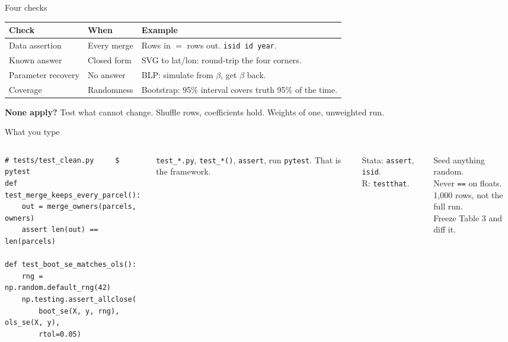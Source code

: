 \documentclass[9pt,aspectratio=169]{beamer}
\begin{document}
\begin{frame}{Four checks}

  \vspace{0.35cm}
  \renewcommand{\arraystretch}{1.7}
  \small
  \begin{tabular}{@{}p{} p{} p{}@{}}
    \toprule
    {\color{bhblue}\bfseries Check} & {\color{bhblue}\bfseries When} & {\color{bhblue}\bfseries Example} \\
    \midrule
    Data assertion     & Every merge  & Rows in $=$ rows out. \texttt{isid id year}. \\
    Known answer       & Closed form  & SVG to lat/lon: round-trip the four corners. \\
    Parameter recovery & No answer    & BLP: simulate from $\beta$, get $\beta$ back. \\
    Coverage           & Randomness   & Bootstrap: 95\% interval covers truth 95\% of the time. \\
    \bottomrule
  \end{tabular}

  \vspace{0.6cm}
  {\color{bhblue}\bfseries None apply?} Test what cannot change. Shuffle rows, coefficients hold.
  Weights of one, unweighted run.

\end{frame}

\begin{frame}[fragile]{What you type}

  \vspace{0.2cm}
  \begin{columns}[T,onlytextwidth]
\begin{lstlisting}[style=py]
# tests/test_clean.py     $ pytest
def test_merge_keeps_every_parcel():
    out = merge_owners(parcels, owners)
    assert len(out) == len(parcels)

def test_boot_se_matches_ols():
    rng = np.random.default_rng(42)
    np.testing.assert_allclose(
        boot_se(X, y, rng), ols_se(X, y),
        rtol=0.05)
\end{lstlisting}

    \vspace{0.1cm}
    \small
    \texttt{test\_*.py}, \texttt{test\_*()}, \texttt{assert}, run \texttt{pytest}.
    That is the framework.

    \vspace{0.35cm}
    Stata: \texttt{assert}, \texttt{isid}.\\
    R: \texttt{testthat}.

    \vspace{0.35cm}
    Seed anything random.\\
    Never \texttt{==} on floats.\\
    1{,}000 rows, not the full run.\\
    Freeze Table 3 and diff it.
  \end{columns}

\end{frame}
\end{document}
